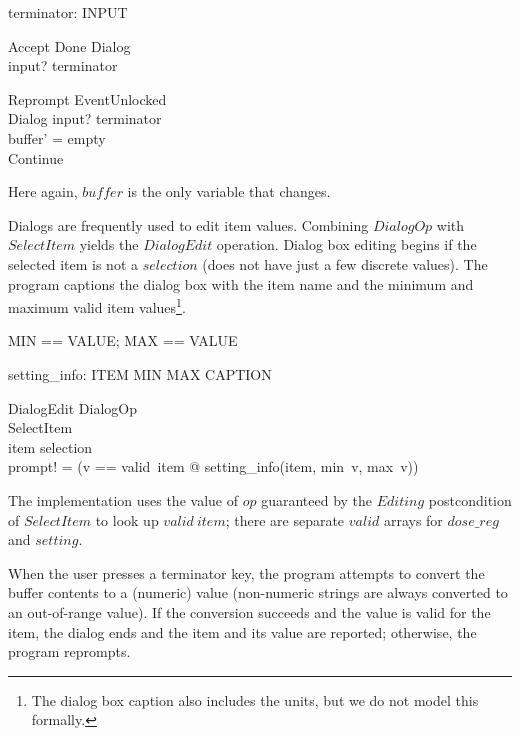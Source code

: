 \documentclass{article}
\begin{document}
\begin{axdef}
	terminator: \power INPUT
\end{axdef}

\begin{schema}{Accept}
	Done
\where
	Dialog \\
	input? \in terminator
\end{schema}

\begin{schema}{Reprompt}
	EventUnlocked \\
	\Delta Dialog
\where
	input? \in terminator \\
	buffer' = empty \\
	Continue
\end{schema}
Here again, $buffer$ is the only variable that changes.

Dialogs are frequently used to edit item values. Combining $DialogOp$
with $SelectItem$ yields the $DialogEdit$ operation.  Dialog box
editing begins if the selected item is not a $selection$ (does not
have just a few discrete values).  The program captions the dialog box
with the item name and the minimum and maximum valid item
values\footnote{The dialog box caption also includes the units, but we
do not model this formally.}.
	
\begin{zed} MIN == VALUE; MAX == VALUE \end{zed}

\begin{axdef}
	setting\_info: ITEM \cross MIN \cross MAX \fun CAPTION
\end{axdef}

\begin{schema}{DialogEdit}
	DialogOp \\
	SelectItem \\
\where
	item \notin selection \\
	prompt! = (\LET v == valid~item @ setting\_info(item, min~v, max~v))
\end{schema}
The implementation uses the value of $op$ guaranteed by the $Editing$
postcondition of $SelectItem$ to look up $valid~item$; there are
separate $valid$ arrays for $dose\_reg$ and $setting$.

When the user presses a terminator key, the program attempts to
convert the buffer contents to a (numeric) value (non-numeric strings
are always converted to an out-of-range value).  If the conversion
succeeds and the value is valid for the item, the dialog ends and the
item and its value are reported; otherwise, the program reprompts.
\end{document}
